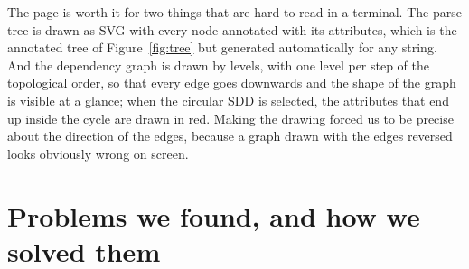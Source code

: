 \documentclass[11pt]{article}
\begin{document}
The page is worth it for two things that are hard to read in a terminal. The parse tree
is drawn as SVG with every node annotated with its attributes, which is the annotated
tree of Figure~\ref{fig:tree} but generated automatically for any string. And the
dependency graph is drawn by levels, with one level per step of the topological order,
so that every edge goes downwards and the shape of the graph is visible at a glance;
when the circular SDD is selected, the attributes that end up inside the cycle are drawn
in red. Making the drawing forced us to be precise about the direction of the edges,
because a graph drawn with the edges reversed looks obviously wrong on screen.

\section{Problems we found, and how we solved them}
\end{document}
